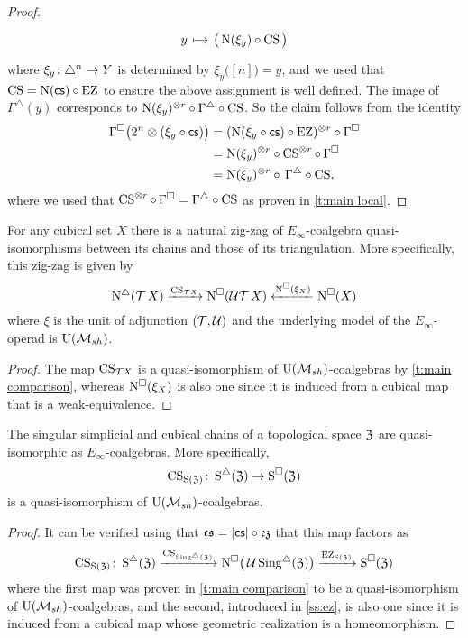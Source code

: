 \begin{proof}
\[\begin{tikzcd}[column sep=small, row sep=0]
		y \arrow[r,mapsto]& \big( \chains(\xi_y) \circ \CS \big)
	\end{tikzcd}
	\]
	where $\xi_y \colon \triangle^n \to Y$ is determined by $\xi_y \big( [n] \big) = y$, and we used that $\operatorname{CS} = \operatorname{N}(\operatorname{\mathsf{cs}}) \circ \operatorname{EZ}$ to ensure the above assignment is well defined.
	The image of $\Gamma^\triangle(y)$ corresponds to $\operatorname{N}(\xi_y)^{\otimes r} \circ \Gamma^\triangle \circ \operatorname{CS}$.
	So the claim follows from the identity
	\begin{align*}
		\Gamma^\square \big( 2^n \otimes (\xi_y \circ \operatorname{\mathsf{cs}}) \big) &=
		(\operatorname{N}(\xi_y \circ \operatorname{\mathsf{cs}}) \circ \operatorname{EZ})^{\otimes r} \circ \Gamma^\square \\ &=
		\operatorname{N}(\xi_y)^{\otimes r} \circ \operatorname{CS}^{\otimes r} \circ \, \Gamma^\square \\ &=
		\operatorname{N}(\xi_y)^{\otimes r} \circ \, \Gamma^\triangle \circ \operatorname{CS},
	\end{align*}
	where we used that $\operatorname{CS}^{\otimes r} \circ \, \Gamma^\square = \Gamma^\triangle \circ \operatorname{CS}$ as proven in \cref{t:main local}.
\end{proof}

\begin{corollary} \label{c:zig-zag}
	For any cubical set $X$ there is a natural zig-zag of $E_\infty$-coalgebra quasi-isomorphisms between its chains and those of its triangulation.
	More specifically, this zig-zag is given by
	\[
	\operatorname{N^{\triangle}}(\operatorname{\mathcal{T}} X) \xrightarrow{\operatorname{CS}_{\mathcal{T} X}}
	\operatorname{N^{\square}}(\mathcal{U}{\operatorname{\mathcal{T}} X}) \xleftarrow{\operatorname{N^{\square}}(\xi_X)}
	\operatorname{N^{\square}}(X)
	\]
	where $\xi$ is the unit of adjunction $(\operatorname{\mathcal{T}}, \operatorname{\mathcal{U}})$ and the underlying model of the $E_\infty$-operad is ${\operatorname{U}(\mathcal{M}_{sh})}$.
\end{corollary}

\begin{proof}
	The map $\operatorname{CS}_{\mathcal{T} X}$ is a quasi-isomorphism of ${\operatorname{U}(\mathcal{M}_{sh})}$-coalgebras by \cref{t:main comparison}, whereas $\operatorname{N^{\square}}(\xi_X)$ is also one since it is induced from a cubical map that is a weak-equivalence.
\end{proof}

\begin{corollary} \label{c:cs e infty}
	The singular simplicial and cubical chains of a topological space $\mathfrak{Z}$ are quasi-isomorphic as $E_\infty$-coalgebras.
	More specifically,
	\[
	\operatorname{CS}_{\operatorname{S}(\mathfrak{Z})} \colon \operatorname{\operatorname{S}^{\triangle}}(\mathfrak{Z}) \to \operatorname{\operatorname{S}^{\square}}(\mathfrak{Z})
	\]
	is a quasi-isomorphism of ${\operatorname{U}(\mathcal{M}_{sh})}$-coalgebras.
\end{corollary}

\begin{proof}
	It can be verified using that $\operatorname{\mathfrak{cs}} = \lvert\operatorname{\mathsf{cs}}\rvert \circ \operatorname{\mathfrak{ez}}$ that this map factors as
	\[
	\operatorname{CS}_{\operatorname{S}(\mathfrak{Z})} \colon \operatorname{\operatorname{S}^{\triangle}}(\mathfrak{Z}) \xrightarrow{\operatorname{CS}_{\operatorname{Sing^{\triangle}}(\mathfrak{Z})}} \operatorname{N^{\square}}\!\big(\operatorname{\mathcal{U}}\operatorname{Sing^{\triangle}}(\mathfrak{Z})\big) \xrightarrow{\operatorname{EZ}_{\operatorname{S}(\mathfrak{Z})}} \operatorname{\operatorname{S}^{\square}}(\mathfrak{Z})
	\]
	where the first map was proven in \cref{t:main comparison} to be a quasi-isomorphism of ${\operatorname{U}(\mathcal{M}_{sh})}$-coalgebras, and the second, introduced in \cref{ss:ez}, is also one since it is induced from a cubical map whose geometric realization is a homeomorphism.
\end{proof}

